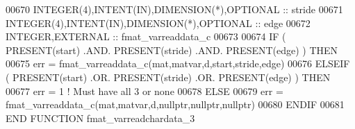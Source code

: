 \begin{DoxyCode}
00670     \textcolor{keywordtype}{INTEGER(4)},\textcolor{keywordtype}{INTENT(IN)},\textcolor{keywordtype}{DIMENSION(*)},\textcolor{keywordtype}{OPTIONAL} :: stride
00671     \textcolor{keywordtype}{INTEGER(4)},\textcolor{keywordtype}{INTENT(IN)},\textcolor{keywordtype}{DIMENSION(*)},\textcolor{keywordtype}{OPTIONAL} :: edge
00672     \textcolor{keywordtype}{INTEGER},\textcolor{keywordtype}{EXTERNAL}                            :: fmat\_varreaddata\_c
00673 
00674     \textcolor{keywordflow}{IF} ( \textcolor{keyword}{PRESENT}(start) .AND. \textcolor{keyword}{PRESENT}(stride) .AND. \textcolor{keyword}{PRESENT}(edge) ) \textcolor{keywordflow}{THEN}
00675         err = fmat\_varreaddata\_c(mat,matvar,d,start,stride,edge)
00676     \textcolor{keywordflow}{ELSEIF} ( \textcolor{keyword}{PRESENT}(start) .OR. \textcolor{keyword}{PRESENT}(stride) .OR. \textcolor{keyword}{PRESENT}(edge) ) \textcolor{keywordflow}{THEN}
00677         err = 1    \textcolor{comment}{! Must have all 3 or none}
00678     \textcolor{keywordflow}{ELSE}
00679         err = fmat\_varreaddata\_c(mat,matvar,d,nullptr,nullptr,nullptr)
00680 \textcolor{keywordflow}{    ENDIF}
00681 \textcolor{keyword}{END FUNCTION }fmat\_varreadchardata\_3
\end{DoxyCode}
